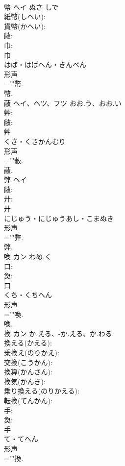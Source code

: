 \documentclass[8pt]{extreport}
\begin{document}
\begin{CJK}{UTF8}{min}
\\	幣	ヘイ	ぬさ	しで	
\\	紙幣(しへい): 
\\	貨幣(かへい): 
\\	敝: 
\\	巾: 
\\	巾	
\\	はば・はばへん・きんべん	
\\	形声 
\\	=""幣.
\\	幣.
\\	蔽	ヘイ、ヘツ、フツ	おお.う、おお.い		
\\	艸: 
\\	敝: 
\\	艸	
\\	くさ・くさかんむり	
\\	形声 
\\	=""蔽.
\\	蔽.
\\	弊	ヘイ			
\\	敝: 
\\	廾: 
\\	廾	
\\	にじゅう・にじゅうあし・こまぬき	
\\	形声 
\\	=""弊.
\\	弊.
\\	喚	カン	わめ.く		
\\	口: 
\\	奐: 
\\	口	
\\	くち・くちへん	
\\	形声 
\\	=""喚.
\\	喚.
\\	換	カン	か.える、-か.える、か.わる		
\\	換える(かえる): 
\\	乗換え(のりかえ): 
\\	交換(こうかん): 
\\	換算(かんさん): 
\\	換気(かんき): 
\\	乗り換える(のりかえる): 
\\	転換(てんかん): 
\\	手: 
\\	奐: 
\\	手	
\\	て・てへん	
\\	形声 
\\	=""換.

\end{CJK}
\end{document}
